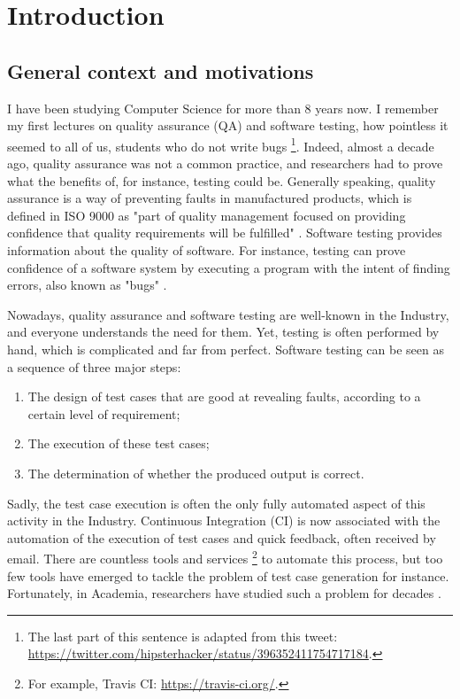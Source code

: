 %
\chapter{Introduction}
\label{sec:intro}

\minitoc

\section{General context and motivations}

I have been studying Computer Science for more than 8 years now.
I remember my first lectures on quality assurance (QA) and
software testing, how pointless it seemed to all of us, students
who do not write bugs \footnote{The last part of this sentence is
adapted from this tweet:
\url{https://twitter.com/hipsterhacker/status/396352411754717184}.}.
Indeed, almost a decade ago, quality assurance was not a common
practice, and researchers had to prove what the benefits of, for
instance, testing could be. Generally speaking, quality assurance
is a way of preventing faults in manufactured products, which is
defined in ISO 9000 as "part of quality management focused on
providing confidence that quality requirements will be fulfilled"
\cite{iso20059000}. Software testing provides information about
the quality of software. For instance, testing can prove
confidence of a software system by executing a program with the
intent of finding errors, also known as "bugs"
\cite{Myers:1979:AST:539883}.

Nowadays, quality assurance and software testing are well-known
in the Industry, and everyone understands the need for them.
Yet, testing is often performed by hand, which is complicated
and far from perfect. Software testing can be seen as a sequence
of three major steps:

\begin{enumerate}
    \item The design of test cases that are good at revealing
        faults, according to a certain level of requirement;

    \item The execution of these test cases;

    \item The determination of whether the produced output is
        correct.
\end{enumerate}

Sadly, the test case execution is often the only fully automated
aspect of this activity in the Industry. Continuous Integration
(CI) \cite{booch1991object} is now associated with the automation
of the execution of test cases and quick feedback, often received
by email. There are countless tools and services
\footnote{For example, Travis CI: \url{https://travis-ci.org/}.}
to automate this process, but too few tools have emerged to
tackle the problem of test case generation for instance.
Fortunately, in Academia, researchers have studied such a problem
for decades \cite{4221614}.

